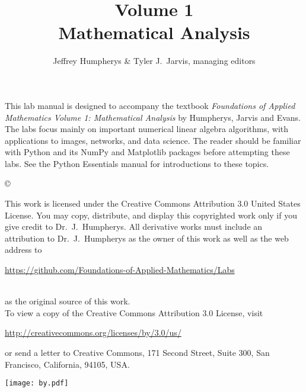 \documentclass[opener-c,labs,blue,nociteref]{HJnewsiambook}
\title{Volume 1\\ Mathematical Analysis}
\author{Jeffrey Humpherys \& Tyler J.~Jarvis, managing editors}
\begin{document}

\newif\ifbyu
\byufalse %

\thispagestyle{empty} %
\maketitle
\thispagestyle{empty}
\frontmatter



\begin{thepreface} %

This lab manual is designed to accompany the textbook \emph{Foundations of Applied Mathematics Volume 1: Mathematical Analysis} by Humpherys, Jarvis and Evans.
The labs focus mainly on important numerical linear algebra algorithms, with applications to images, networks, and data science.
The reader should be familiar with Python \cite{vanrossum2010python} and its NumPy \cite{oliphant2006guide,ascher2001numerical,oliphant2007python} and Matplotlib \cite{Hunter:2007} packages before attempting these labs.
See the Python Essentials manual for introductions to these topics.

\vfill
\copyright{This work is licensed under the Creative Commons Attribution 3.0 United States License.
You may copy, distribute, and display this copyrighted work only if you give credit to Dr.~J.~Humpherys.
All derivative works must include an attribution to Dr.~J.~Humpherys as the owner of this work as well as the web address to
\\
\centerline{\url{https://github.com/Foundations-of-Applied-Mathematics/Labs}}
\\
as the original source of this work.
\\
To view a copy of the Creative Commons Attribution 3.0 License, visit
\\
\centerline{\url{http://creativecommons.org/licenses/by/3.0/us/}}
or send a letter to Creative Commons, 171 Second Street, Suite 300, San Francisco, California, 94105, USA.}

\vfill
\centering\texttt{[image: by.pdf]}
\vfill
\end{thepreface}

\setcounter{tocdepth}{1}
\tableofcontents

\mainmatter %
\end{document}
